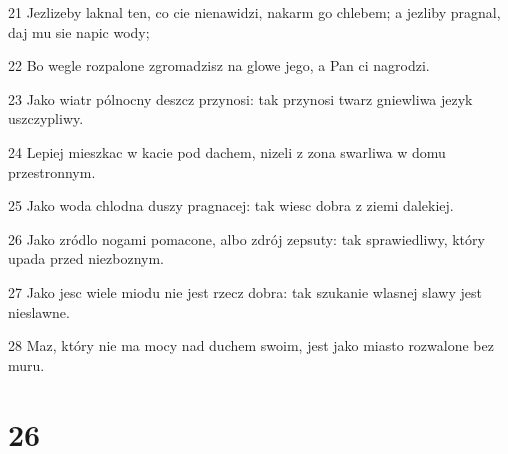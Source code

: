 \par 21 Jezlizeby laknal ten, co cie nienawidzi, nakarm go chlebem; a jezliby pragnal, daj mu sie napic wody;
\par 22 Bo wegle rozpalone zgromadzisz na glowe jego, a Pan ci nagrodzi.
\par 23 Jako wiatr pólnocny deszcz przynosi: tak przynosi twarz gniewliwa jezyk uszczypliwy.
\par 24 Lepiej mieszkac w kacie pod dachem, nizeli z zona swarliwa w domu przestronnym.
\par 25 Jako woda chlodna duszy pragnacej: tak wiesc dobra z ziemi dalekiej.
\par 26 Jako zródlo nogami pomacone, albo zdrój zepsuty: tak sprawiedliwy, który upada przed niezboznym.
\par 27 Jako jesc wiele miodu nie jest rzecz dobra: tak szukanie wlasnej slawy jest nieslawne.
\par 28 Maz, który nie ma mocy nad duchem swoim, jest jako miasto rozwalone bez muru.

\chapter{26}

